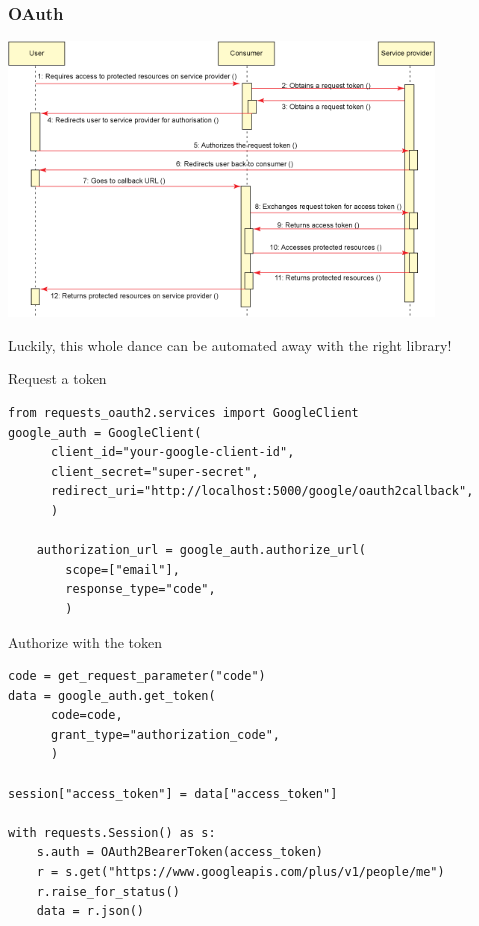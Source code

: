 \documentclass[dvipsnames]{beamer}
\begin{document}
\begin{frame}
  \frametitle{OAuth}
  \begin{center}
    \includegraphics[width=320pt]{img/oauth-seq.png}
  \end{center}
\end{frame}


\begin{frame}[fragile=singleslide]
  Luckily, this whole dance can be automated away with the right library!
  \begin{block}{Request a token}
    {\tiny
    \begin{Verbatim}
from requests_oauth2.services import GoogleClient
google_auth = GoogleClient(
      client_id="your-google-client-id",
      client_secret="super-secret",
      redirect_uri="http://localhost:5000/google/oauth2callback",
      )

    authorization_url = google_auth.authorize_url(
        scope=["email"],
        response_type="code",
        )
    \end{Verbatim}
    }
  \end{block}
  \begin{block}{Authorize with the token}
    {\tiny
    \begin{Verbatim}
code = get_request_parameter("code")
data = google_auth.get_token(
      code=code,
      grant_type="authorization_code",
      )

session["access_token"] = data["access_token"]

with requests.Session() as s:
    s.auth = OAuth2BearerToken(access_token)
    r = s.get("https://www.googleapis.com/plus/v1/people/me")
    r.raise_for_status()
    data = r.json()
\end{Verbatim}
    }
  \end{block}
\end{frame}
\end{document}
